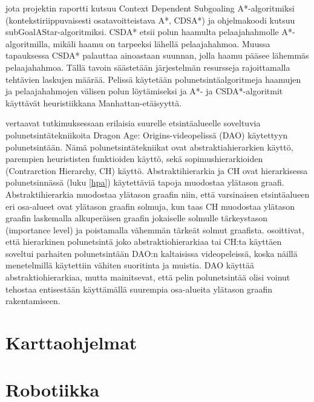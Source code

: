 jota projektin raportti kutsuu Context Dependent Subgoaling A*-algoritmiksi
(kontekstiriippuvaisesti osatavoitteistava A*, CDSA*) ja ohjelmakoodi kutsuu 
subGoalAStar-algoritmiksi. CSDA* etsii polun haamulta pelaajahahmolle 
A*-algoritmilla, mikäli haamu on tarpeeksi lähellä pelaajahahmoa. Muussa 
tapauksessa CSDA* palauttaa ainoastaan suunnan, jolla haamu pääsee lähemmäs 
pelaajahahmoa. Tällä tavoin säästetään järjestelmän resursseja rajoittamalla 
tehtävien laskujen määrää. Pelissä käytetään polunetsintäalgoritmeja 
haamujen ja pelaajahahmojen välisen polun löytämiseksi ja A*- ja 
CSDA*-algoritmit käyttävät heuristiikkana Manhattan-etäisyyttä. \par
	\textcite{SturtevantDAO} vertaavat tutkimuksessaan erilaisia 
suurelle etsintäalueelle soveltuvia polunetsintätekniikoita Dragon Age: 
Origins-videopelissä (DAO) käytettyyn polunetsintään. Nämä 
polunetsintätekniikat ovat abstraktiahierarkien käyttö, parempien 
heurististen funktioiden käyttö, sekä sopimushierarkioiden (Contrarction 
Hierarchy, CH) käyttö. Abstraktihierarkia ja CH ovat hierarkisessa 
polunetsinnässä (luku \ref{hpa}) käytettäviä tapoja muodostaa ylätason 
graafi. Abstraktihierarkia muodostaa ylätason graafin niin, että 
varsinaisen etsintäalueen eri osa-alueet ovat ylätason graafin solmuja, kun 
taas CH muodostaa ylätason graafin laskemalla alkuperäisen graafin jokaiselle 
solmulle tärkeystason (importance level) ja poistamalla vähemmän tärkeät 
solmut graafista. \textcite{SturtevantDAO} osoittivat, että hierarkinen 
polunetsintä joko abstraktiohierarkiaa tai CH:ta käyttäen soveltui parhaiten 
polunetsintään DAO:n kaltaisissa videopeleissä, koska näillä menetelmillä 
käytettiin vähiten suoritinta ja muistia. DAO käyttää abstraktiohierarkiaa, 
mutta \textcite{SturtevantDAO} mainitsevat, että pelin polunetsintää olisi 
voinut tehostaa entisestään käyttämällä suurempia osa-alueita ylätason 
graafin rakentamiseen.

\section{Karttaohjelmat}\label{karttaohjelmat}
\section{Robotiikka}\label{robotiikka}
